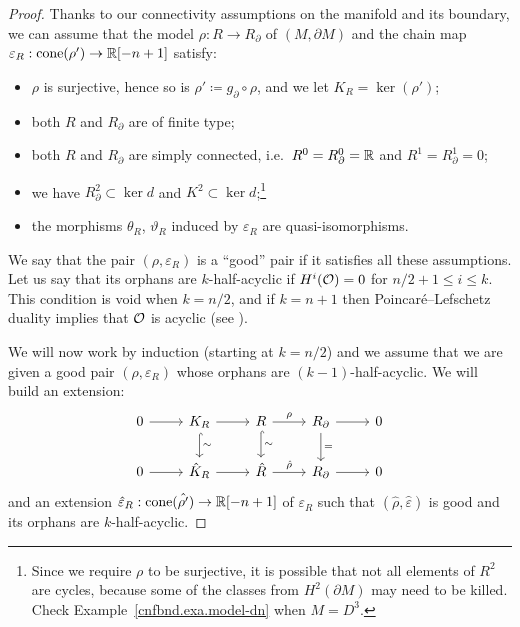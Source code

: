 \begin{proof}
  Thanks to our connectivity assumptions on the manifold and its boundary, we can assume that the model $\rho : R \to R_{\partial}$ of $(M, \partial M)$ and the chain map $\varepsilon_{R} : \operatorname{cone}(\rho') \to \mathbb{R}[-n+1]$ satisfy:
  \begin{itemize}
  \item $\rho$ is surjective, hence so is $\rho' \coloneqq g_{\partial} \circ \rho$, and we let $K_{R} = \ker(\rho')$;
  \item both $R$ and $R_{\partial}$ are of finite type;
  \item both $R$ and $R_{\partial}$ are simply connected, i.e.\ $R^{0} = R_{\partial}^{0} = \mathbb{R}$ and $R^{1} = R_{\partial}^{1} = 0$;
  \item we have $R_{\partial}^{2} \subset \ker d$ and $K^{2} \subset \ker d$;\footnote{Since we require $\rho$ to be surjective, it is possible that not all elements of $R^{2}$ are cycles, because some of the classes from $H^{2}(\partial M)$ may need to be killed. Check Example~\ref{cnfbnd.exa.model-dn} when $M = D^{3}$.}
  \item the morphisms $\theta_{R}$, $\vartheta_{R}$ induced by $\varepsilon_{R}$ are quasi-isomorphisms.
  \end{itemize}

  We say that the pair $(\rho,\varepsilon_{R})$ is a ``good'' pair if it satisfies all these assumptions.
  Let us say that its orphans are $k$-half-acyclic if $H^{i}(\mathcal{O}) = 0$ for $n/2 +1 \leq i \leq k$.
  This condition is void when $k = n/2$, and if $k = n+1$ then Poincaré--Lefschetz duality implies that $\mathcal{O}$ is acyclic (see \cite[Proposition~3.6]{LambrechtsStanley2008}).

  We will now work by induction (starting at $k = n/2$) and we assume that we are given a good pair $(\rho,\varepsilon_{R})$ whose orphans are $(k-1)$-half-acyclic.
  We will build an extension:
  \begin{equation}
    \begin{tikzcd}
      0 \rar
      & K_{R} \rar \dar[hookrightarrow]{\sim}
      & R \rar{\rho} \dar[hookrightarrow]{\sim}
      & R_{\partial} \rar \dar{=}
      & 0
      \\
      0 \rar
      & \hat{K}_{R} \rar
      & \hat{R} \rar{\hat{\rho}}
      & R_{\partial} \rar
      & 0
    \end{tikzcd}
  \end{equation}
  and an extension $\hat{\varepsilon}_{R} : \operatorname{cone}(\hat{\rho'}) \to \mathbb{R}[-n+1]$ of $\varepsilon_{R}$ such that $(\hat{\rho},\hat{\varepsilon})$ is good and its orphans are $k$-half-acyclic.
   

\end{proof}
